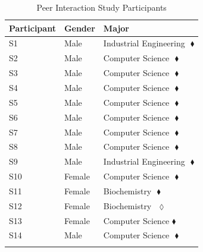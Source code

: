 \begin{table}[H]
	\caption{Peer Interaction Study Participants}
	\centering
	\begin{tabular}{lll}
		\hline
		\textbf{Participant} & \textbf{Gender} & \textbf{Major} \\
		\hline
		S1 & Male & Industrial Engineering $   $ $\blacklozenge$\\
		S2 & Male & Computer Science $   $ $\blacklozenge$\\
		S3 & Male & Computer Science $   $ $\blacklozenge$\\
		S4 & Male & Computer Science $   $ $\blacklozenge$\\
		S5 & Male & Computer Science $   $ $\blacklozenge$\\
		S6 & Male & Computer Science $   $ $\blacklozenge$\\
		S7 & Male & Computer Science $   $ $\blacklozenge$\\
		S8 & Male & Computer Science $   $ $\blacklozenge$\\
		S9 & Male & Industrial Engineering $   $ $\blacklozenge$\\
		S10 & Female & Computer Science $   $ $\blacklozenge$\\
		S11 & Female & Biochemistry $   $ $\blacklozenge$\\
		S12 & Female & Biochemistry $   $ $\lozenge$\\
		S13 & Female&Computer Science$   $ $\blacklozenge$\\
		S14 & Male & Computer Science $   $ $\blacklozenge$\\
		\hline \\
		\end{tabular}
	

\end{table}
